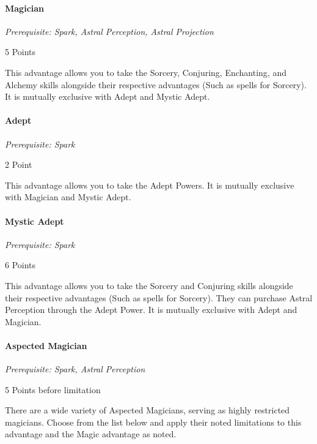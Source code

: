 \begin{multicols}{3}
	\paragraph{Magician}
	\textit{Prerequisite: Spark, Astral Perception, Astral Projection}
	\begin{flushright}
		5 Points
	\end{flushright}
	
	This advantage allows you to take the Sorcery, Conjuring, Enchanting, and Alchemy skills alongside their respective advantages (Such as spells for Sorcery). It is mutually exclusive with Adept and Mystic Adept.
	
	\paragraph{Adept}
	\textit{Prerequisite: Spark}
	\begin{flushright}
		2 Point
	\end{flushright}
	
	This advantage allows you to take the Adept Powers. It is mutually exclusive with Magician and Mystic Adept.
	
	\paragraph{Mystic Adept}
	\textit{Prerequisite: Spark}
	\begin{flushright}
		6 Points
	\end{flushright}    
	
	This advantage allows you to take the Sorcery and Conjuring skills alongside their respective advantages (Such as spells for Sorcery). They can purchase Astral Perception through the Adept Power. It is mutually exclusive with Adept and Magician.
	
	\paragraph{Aspected Magician}
	\textit{Prerequisite: Spark, Astral Perception}
	\begin{flushright}
		5 Points before limitation
	\end{flushright}
	
	There are a wide variety of Aspected Magicians, serving as highly restricted magicians. Choose from the list below and apply their noted limitations to this advantage and the Magic advantage as noted.
	

\end{multicols}
